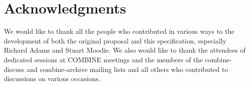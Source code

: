 
\section{Acknowledgments}
We would like to thank all the people who contributed in various ways to the development of both the original proposal and this specification, especially Richard Adams and Stuart Moodie. 
We also would like to thank the attendees of dedicated sessions at COMBINE meetings and the members of the \textsf{combine-discuss} and \textsf{combine-archive} mailing lists and all others who contributed to 
discussions on various occasions. 




